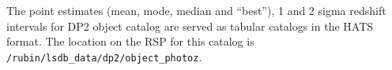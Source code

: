 The \photoz  point estimates (mean, mode, median and ``best''), 1 and 2 sigma redshift intervals for DP2 object catalog are served as tabular catalogs in the HATS format.
The location on the RSP for this catalog is \texttt{/rubin/lsdb\_data/dp2/object\_photoz}.


